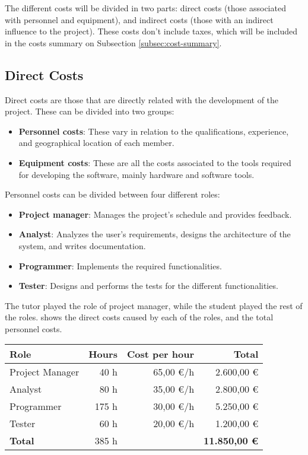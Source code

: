 \makeatother


The different costs will be divided in two parts: direct costs (those associated with personnel and equipment), and indirect costs (those with an indirect influence to the project). These costs don't include taxes, which will be included in the costs summary on Subsection \ref{subsec:cost-summary}.


\subsection{Direct Costs}
Direct costs are those that are directly related with the development of the project. These can be divided into two groups:
\begin{itemize}
  \item \textbf{Personnel costs}: These vary in relation to the qualifications, experience, and geographical location of each member.
  \item \textbf{Equipment costs}: These are all the costs associated to the tools required for developing the software, mainly hardware and software tools.
\end{itemize}

\noindent
Personnel costs can be divided between four different roles:
\begin{itemize}
  \item \textbf{Project manager}: Manages the project's schedule and provides feedback.
  \item \textbf{Analyst}: Analyzes the user's requirements, designs the architecture of the system, and writes documentation.
  \item \textbf{Programmer}: Implements the required functionalities.
  \item \textbf{Tester}: Designs and performs the tests for the different functionalities.
\end{itemize}

The tutor played the role of project manager, while the student played the rest of the roles.  shows the direct costs caused by each of the roles, and the total personnel costs.

\begin{table}[htb]
    {
      \begin{tabular}{lrrr}
        \toprule
        \textbf{Role} & \textbf{Hours} & \textbf{Cost per hour} & \textbf{Total} \\
        \midrule
        Project Manager &  40 h & 65,00 €/h & 2.600,00 € \\
        Analyst         &  80 h & 35,00 €/h & 2.800,00 € \\
        Programmer      & 175 h & 30,00 €/h & 5.250,00 € \\
        Tester          &  60 h & 20,00 €/h & 1.200,00 € \\
        \midrule
        \textbf{Total}  & 385 h &           & \textbf{11.850,00 €} \\
        \bottomrule
      \end{tabular}
    }
\end{table}

